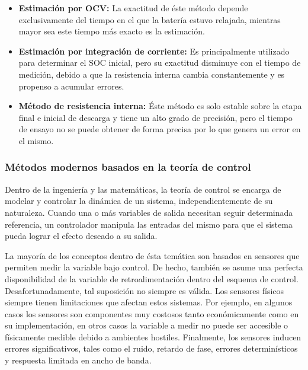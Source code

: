 \documentclass[10pt,a4paper]{article}
\begin{document}
\begin{itemize}
    \item \textbf{Estimaci\'on por OCV:} La exactitud de \'este m\'etodo depende
        exclusivamente del tiempo en el que la bater\'ia estuvo relajada,
        mientras mayor sea este tiempo m\'as exacto es la estimaci\'on.
    \item \textbf{Estimaci\'on por integraci\'on de corriente:} Es
        principalmente utilizado para determinar el \acrshort{SOC} inicial, pero
        su exactitud disminuye con el tiempo de medici\'on, debido a que la
        resistencia interna cambia constantemente y es propenso a acumular
        errores.
    \item \textbf{M\'etodo de resistencia interna:} \'Este m\'etodo es solo
        estable sobre la etapa final e inicial de descarga y tiene un alto grado 
        de precisi\'on, pero el tiempo de ensayo no se puede obtener de forma
        precisa por lo que genera un error en el mismo.
\end{itemize}


\subsubsection{M\'etodos modernos basados en la teor\'ia de control}
\label{controlTheoryMethod}

\noindent Dentro de la ingenier\'ia y las matem\'aticas, la teor\'ia de control 
se encarga de modelar y controlar la din\'amica de un sistema,
independientemente de su naturaleza. Cuando una o m\'as variables de salida 
necesitan seguir determinada referencia, un controlador manipula las 
entradas del mismo para que el sistema pueda lograr el efecto deseado a su 
salida.

\noindent La mayor\'ia de los conceptos dentro de \'esta tem\'atica son
basados en sensores que permiten medir la variable bajo control. De hecho, 
tambi\'en se asume una perfecta disponibilidad de la variable de 
retroalimentaci\'on dentro del esquema de control. Desafortunadamente, tal
suposici\'on no siempre es v\'alida. Los sensores f\'isicos siempre tienen
limitaciones que afectan estos sistemas. Por ejemplo, en algunos casos
los sensores son componentes muy costosos tanto econ\'omicamente como en su
implementaci\'on, en otros casos la variable a medir no puede ser accesible o 
f\'isicamente medible debido a ambientes hostiles. Finalmente, los sensores 
inducen errores significativos, tales como el ruido, retardo de fase, errores 
determin\'isticos y respuesta limitada en ancho de banda.
\end{document}
